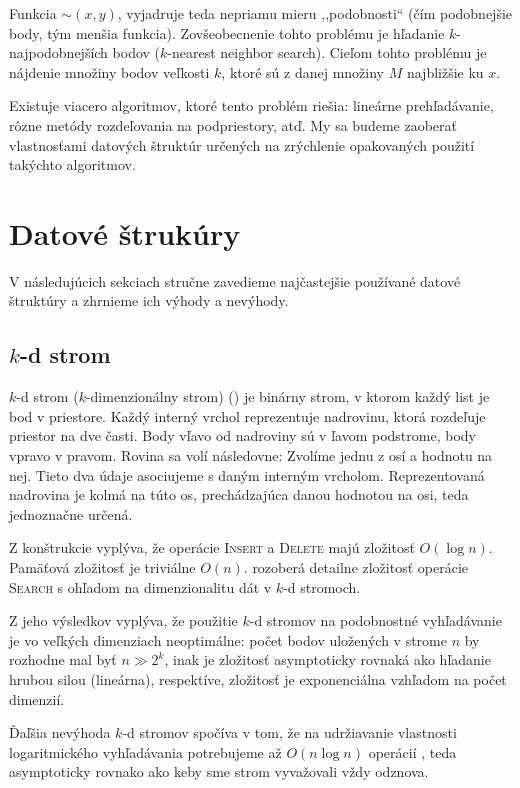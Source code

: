 \documentclass[12pt,a4paper,oneside]{article}
\begin{document}
{Funkcia $\sim(x, y)$, vyjadruje teda nepriamu mieru ,,podobnosti`` (čím podobnejšie body, tým menšia funkcia). Zovšeobecnenie tohto problému je hľadanie $k$-najpodobnejších bodov ($k$-nearest neighbor search). Cieľom tohto problému je nájdenie množiny bodov veľkosti $k$, ktoré sú z danej množiny $M$ najbližšie ku $x$.

Existuje viacero algoritmov, ktoré tento problém riešia: lineárne prehľadávanie, rôzne metódy rozdeľovania na podpriestory, atď. My sa budeme zaoberať vlastnosťami datových štruktúr určených na zrýchlenie opakovaných použití takýchto algoritmov.

\section{Datové štrukúry}

V následujúcich sekciach stručne zavedieme najčastejšie používané datové štruktúry a zhrnieme ich výhody a nevýhody.

\subsection{$k$-d strom}\label{kdtree}

$k$-d strom ($k$-dimenzionálny strom) (\citet{Bentley75}) je binárny strom, v ktorom každý list je bod v priestore. 
Každý interný vrchol reprezentuje nadrovinu, ktorá rozdeľuje priestor na dve časti. Body vľavo od nadroviny sú v ľavom podstrome, body vpravo v pravom. Rovina sa volí následovne:
Zvolíme jednu z osí a hodnotu na nej. Tieto dva údaje asociujeme s daným interným vrcholom. Reprezentovaná nadrovina je kolmá na túto os, prechádzajúca danou hodnotou na osi, teda jednoznačne určená.

Z konštrukcie vyplýva, že operácie \textsc{Insert} a \textsc{Delete} majú zložitosť $O(\log n)$. Pamäťová zložitosť je triviálne $O(n)$. \citet{liberty13} rozoberá detailne zložitosť operácie \textsc{Search} s ohľadom na dimenzionalitu dát v $k$-d stromoch.

Z jeho výsledkov vyplýva, že použitie $k$-d stromov na podobnostné vyhľadávanie je vo veľkých dimenziach neoptimálne: počet bodov uložených v strome $n$ by rozhodne mal byť $n \gg 2^k$, inak je zložitosť asymptoticky rovnaká ako hľadanie hrubou silou \citep{indyk04} (lineárna), respektíve, zložitosť je exponenciálna vzhľadom na počet dimenzií.

Ďaľšia nevýhoda $k$-d stromov spočíva v tom, že na udržiavanie vlastnosti logaritmického vyhľadávania potrebujeme až $O(n\log n)$ operácií \citep{Bentley75}, teda asymptoticky rovnako ako keby sme strom vyvažovali vždy odznova.

}
\end{document}
